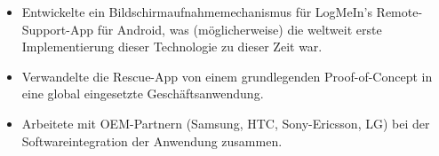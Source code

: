 \begin{minipage}{\linewidth}
\begin{itemize}
  \item Entwickelte ein Bildschirmaufnahmemechanismus für LogMeIn's Remote-Support-App für Android, was (möglicherweise) die weltweit erste Implementierung dieser Technologie zu dieser Zeit war.
  \item Verwandelte die Rescue-App von einem grundlegenden Proof-of-Concept in eine global eingesetzte Geschäftsanwendung.
  \item Arbeitete mit OEM-Partnern (Samsung, HTC, Sony-Ericsson, LG) bei der Softwareintegration der Anwendung zusammen.
\end{itemize}
\end{minipage}
\divider
